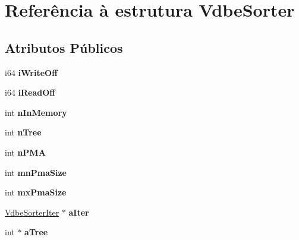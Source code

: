 \hypertarget{struct_vdbe_sorter}{\section{Referência à estrutura Vdbe\-Sorter}
\label{struct_vdbe_sorter}
}
\subsection*{Atributos Públicos}
\begin{DoxyCompactItemize}
\item 
\hypertarget{struct_vdbe_sorter_a5024b3ed80ebd013cad0bc694c81f488}{i64 {\bfseries i\-Write\-Off}}\label{struct_vdbe_sorter_a5024b3ed80ebd013cad0bc694c81f488}

\item 
\hypertarget{struct_vdbe_sorter_a5064ee91d2256d6176210b1556c13790}{i64 {\bfseries i\-Read\-Off}}\label{struct_vdbe_sorter_a5064ee91d2256d6176210b1556c13790}

\item 
\hypertarget{struct_vdbe_sorter_a4704f2debfdf60eeed3ea8cf95d142f9}{int {\bfseries n\-In\-Memory}}\label{struct_vdbe_sorter_a4704f2debfdf60eeed3ea8cf95d142f9}

\item 
\hypertarget{struct_vdbe_sorter_a771cf7f8d421372bf58696cbec5d73dc}{int {\bfseries n\-Tree}}\label{struct_vdbe_sorter_a771cf7f8d421372bf58696cbec5d73dc}

\item 
\hypertarget{struct_vdbe_sorter_a66e6ce431d22c97a6dc672fa94a16e3e}{int {\bfseries n\-P\-M\-A}}\label{struct_vdbe_sorter_a66e6ce431d22c97a6dc672fa94a16e3e}

\item 
\hypertarget{struct_vdbe_sorter_a6d201d0f496260f7f2c7f450cae5898b}{int {\bfseries mn\-Pma\-Size}}\label{struct_vdbe_sorter_a6d201d0f496260f7f2c7f450cae5898b}

\item 
\hypertarget{struct_vdbe_sorter_ab23b8039f7b58052b6c6dfc32aa895ed}{int {\bfseries mx\-Pma\-Size}}\label{struct_vdbe_sorter_ab23b8039f7b58052b6c6dfc32aa895ed}

\item 
\hypertarget{struct_vdbe_sorter_a7c4748645307e20a863cc50ddb75abef}{\hyperlink{struct_vdbe_sorter_iter}{Vdbe\-Sorter\-Iter} $\ast$ {\bfseries a\-Iter}}\label{struct_vdbe_sorter_a7c4748645307e20a863cc50ddb75abef}

\item 
\hypertarget{struct_vdbe_sorter_a77ff5480e8adac1521775d2e8a7be04f}{int $\ast$ {\bfseries a\-Tree}}\label{struct_vdbe_sorter_a77ff5480e8adac1521775d2e8a7be04f}


\end{DoxyCompactItemize}
